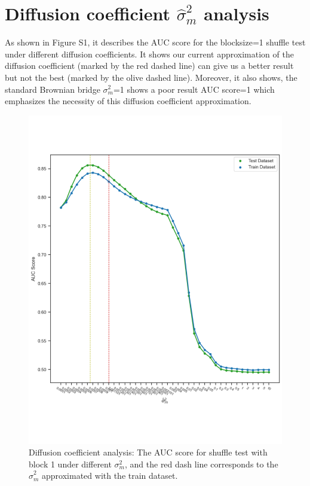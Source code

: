 \documentclass[letterpaper]{article} %
\begin{document}
\section{Diffusion coefficient $\hat{\sigma}^2_m$ analysis}
\label{sec:app1_DCA}
As shown in Figure S1, it describes the AUC score for the blocksize=1 shuffle test under different diffusion coefficients. It shows our current approximation of the diffusion coefficient (marked by the red dashed line) can give us a better result but not the best (marked by the olive dashed line). Moreover, it also shows, the standard Brownian bridge $\sigma^2_m$=1 shows a poor result AUC score=1 which emphasizes the necessity of this diffusion coefficient approximation. 
\begin{figure}[htbp]
\centering
\includegraphics[width=0.7\linewidth, trim={1.1cm 3cm 0cm 2cm},clip]{pictures/auc_check.pdf}
\caption{Diffusion coefficient analysis: The AUC score for shuffle test with block 1 under different $\sigma^2_m$, and the red dash line corresponds to the $\hat{\sigma}^2_m$ approximated with the train dataset.}
\label{fig:diff_coeff_analysis}
\end{figure}
\end{document}
